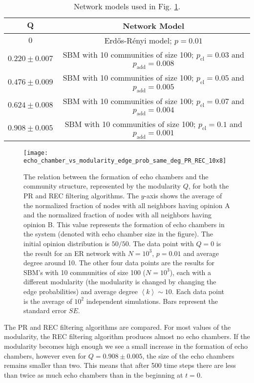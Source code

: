 \documentclass[11 pt , letterpaper , twoside , openright]{book}
\begin{document}
\begin{table}[H]
\centering
\setlength{\tabcolsep}{10pt} %
\renewcommand{\arraystretch}{1.5} %
\begin{tabular}{c | c}
$\bm{Q}$ & \textbf{Network Model} \\
\hline
$0$ & Erd\H{o}s-R\'{e}nyi model; $p=0.01$ \\
$0.220 \pm 0.007$ & SBM with 10 communities of size 100; $p_{\text{cl}} = 0.03$ and $p_{\text{add}} = 0.008$ \\
$0.476 \pm 0.009$ & SBM with 10 communities of size 100; $p_{\text{cl}} = 0.05$ and $p_{\text{add}} = 0.005$ \\
$0.624 \pm 0.008$ & SBM with 10 communities of size 100; $p_{\text{cl}} = 0.07$ and $p_{\text{add}} = 0.004$ \\
$0.908 \pm 0.005$ & SBM with 10 communities of size 100; $p_{\text{cl}} = 0.1$ and $p_{\text{add}} = 0.001$ \\
\end{tabular}
\caption{Network models used in Fig. \ref{echo_vs_mod}.}
\label{tab1}
\end{table}
\newpage
\begin{figure}[H]
	\texttt{[image: echo\_chamber\_vs\_modularity\_edge\_prob\_same\_deg\_PR\_REC\_10x8]}
	\captionsetup{format=plain}
	\caption[Relation between the formation of echo chambers and community structure (modularity $Q$).]{The relation between the formation of echo chambers and the community structure, represented by the modularity $Q$, for both the PR and REC filtering algorithms. The $y$-axis shows the average of the normalized fraction of nodes with all neighbors having opinion A and the normalized fraction of nodes with all neighbors having opinion B. This value represents the formation of echo chambers in the system (denoted with echo chamber size in the figure). The initial opinion distribution is $50/50$. The data point with $Q = 0$ is the result for an ER network with $N = 10^3$, $p = 0.01$ and average degree around 10. The other four data points are the results for SBM's with 10 communities of size 100 ($N = 10^3$), each with a different modularity (the modularity is changed by changing the edge probabilities) and average degree $\left<k\right> \sim 10$. Each data point is the average of $10^2$ independent simulations. Bars represent the standard error $SE$.}
\label{echo_vs_mod}
\end{figure}
\noindent
The PR and REC filtering algorithms are compared. For most values of the modularity, the REC filtering algorithm produces almost no echo chambers. If the modularity becomes high enough we see a small increase in the formation of echo chambers, however even for $Q = 0.908 \pm 0.005$, the size of the echo chambers remains smaller than two. This means that after 500 time steps there are less than twice as much echo chambers than in the beginning at $t=0$.\\
\end{document}
